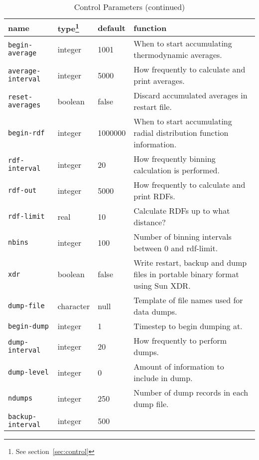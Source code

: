 \begin{table}
\begin{minipage}{\textwidth}
\caption{Control Parameters (continued)}
\begin{tabular}{|l|l|l|p{2.7in}|}
\hline
{\bf name} & {\bf type}\footnote{See section~\ref{sec:control}} &
{\bf default} & {\bf function} \\ \hline \hline
\verb'begin-average' &          integer &               1001 &
When to start accumulating thermodynamic averages. \\
\verb'average-interval' &       integer &               5000 &
How frequently to calculate and print averages. \\
\verb'reset-averages' &         boolean &               false  &
Discard accumulated averages in restart file. \\ \hline
\verb'begin-rdf' &              integer &               1000000 &
When to start accumulating radial distribution function information. \\
\verb'rdf-interval' &           integer &               20 &
How frequently binning calculation is performed. \\
\verb'rdf-out' &                integer &               5000 &
How frequently to calculate and print RDFs. \\
\verb'rdf-limit' &              real &                  10 &
Calculate RDFs up to what distance? \\
\verb'nbins' &                  integer &               100 &
Number of binning intervals between 0 and rdf-limit. \\ \hline
\verb'xdr' &                    boolean &               false &
Write restart,  backup and dump files in portable
binary format using Sun XDR. \\ \hline
\verb'dump-file' &              character  &    null &
Template of file names used for data dumps. \\
\verb'begin-dump' &             integer &               1 &
Timestep to begin dumping at. \\
\verb'dump-interval' &          integer &               20 &
How frequently to perform dumps. \\
\verb'dump-level' &             integer &               0 &
Amount of information to include in dump. \\
\verb'ndumps' &         integer &               250 &
Number of dump records in each dump file. \\ \hline
\verb'backup-interval' &        integer &               500 &

\end{tabular}
\end{minipage}
\end{table}
